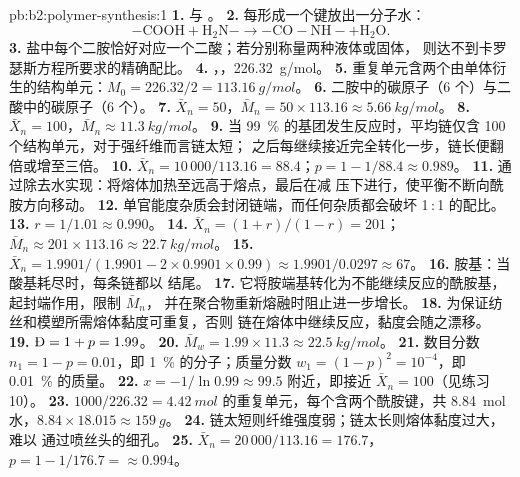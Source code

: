 \begin{solution}{pb:b2:polymer-synthesis:1}
\textbf{1.}  与 。
\textbf{2.} 每形成一个键放出一分子水：
\[\mathrm{{-}COOH + H_2N{-} \longrightarrow {-}CO{-}NH{-} + H_2O}.\]
\textbf{3.} 盐中每个二胺恰好对应一个二酸；若分别称量两种液体或固体，
则达不到卡罗瑟斯方程所要求的精确配比。
\textbf{4.} \ce{-[NH(CH2)6NH-CO(CH2)4CO]-}，，\qty{226.32}{g/mol}。
\textbf{5.} 重复单元含两个由单体衍生的结构单元：$M_0 = 226.32/2 = \qty{113.16}{g/mol}$。
\textbf{6.} 二胺中的碳原子（6 个）与二酸中的碳原子（6 个）。
\textbf{7.} $\bar X_n = 50$，$\bar M_n = 50 \times 113.16 \approx \qty{5.66}{kg/mol}$。
\textbf{8.} $\bar X_n = 100$，$\bar M_n \approx \qty{11.3}{kg/mol}$。
\textbf{9.} 当 99~\% 的基团发生反应时，平均链仅含 100 个结构单元，对于强纤维而言链太短；
之后每继续接近完全转化一步，链长便翻倍或增至三倍。
\textbf{10.} $\bar X_n = 10\,000/113.16 = 88.4$；$p = 1 - 1/88.4 \approx 0.989$。
\textbf{11.} 通过除去水实现：将熔体加热至远高于熔点，最后在减
压下进行，使平衡不断向酰胺方向移动。
\textbf{12.} 单官能度杂质会封闭链端，而任何杂质都会破坏 1\,:\,1 的配比。
\textbf{13.} $r = 1/1.01 \approx 0.990$。
\textbf{14.} $\bar X_n = (1+r)/(1-r) = 201$；$\bar M_n \approx 201 \times 113.16 \approx
\qty{22.7}{kg/mol}$。
\textbf{15.} $\bar X_n = 1.9901/(1.9901 - 2 \times 0.9901 \times 0.99) \approx 1.9901/0.0297 \approx
67$。
\textbf{16.} 胺基：当酸基耗尽时，每条链都以  结尾。
\textbf{17.} 它将胺端基转化为不能继续反应的酰胺基，起封端作用，限制 $\bar M_n$，
并在聚合物重新熔融时阻止进一步增长。
\textbf{18.} 为保证纺丝和模塑所需熔体黏度可重复，否则
链在熔体中继续反应，黏度会随之漂移。
\textbf{19.} $\text{\DH} = 1 + p = 1.99$。
\textbf{20.} $\bar M_w = 1.99 \times 11.3 \approx \qty{22.5}{kg/mol}$。
\textbf{21.} 数目分数 $n_1 = 1 - p = 0.01$，即 1~\% 的分子；质量分数 $w_1 = (1-p)^2 =
10^{-4}$，即 0.01~\% 的质量。
\textbf{22.} $x = -1/\ln 0.99 \approx 99.5$ 附近，即接近 $\bar X_n = 100$（见练习 10）。
\textbf{23.} $1000/226.32 = \qty{4.42}{mol}$ 的重复单元，每个含两个酰胺键，共
\qty{8.84}{mol} 水，$8.84 \times 18.015 \approx \qty{159}{g}$。
\textbf{24.} 链太短则纤维强度弱；链太长则熔体黏度过大，难以
通过喷丝头的细孔。
\textbf{25.} $\bar X_n = 20\,000/113.16 = 176.7$，$p = 1 - 1/176.7 = \boldsymbol{\approx 0.994}$。
\end{solution}
